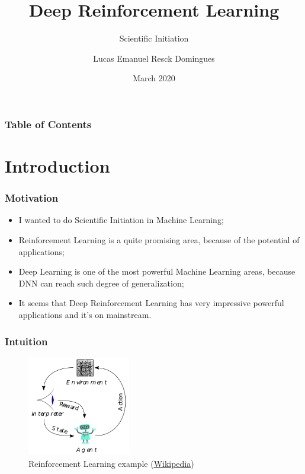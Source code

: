 \documentclass{beamer}
\title[Deep Reinforcement Learning]{Deep Reinforcement Learning}
\subtitle{Scientific Initiation}
\author[Domingues]{Lucas Emanuel Resck Domingues}
\institute[FGV]
{
  Escola de Matemática Aplicada \\
  Fundação Getulio Vargas
}
\date[2020]
{March 2020}
\begin{document}
    \frame{\titlepage}

    \begin{frame}
        \frametitle{Table of Contents}
        \tableofcontents
    \end{frame}

    \section{Introduction}

        \begin{frame}
            \frametitle{Motivation}

            \begin{itemize}
                \item I wanted to do Scientific Initiation in Machine Learning;
                \item Reinforcement Learning is a quite promising area, because of the potential of applications;
                \item Deep Learning is one of the most powerful Machine Learning areas, because DNN can reach such degree of generalization;
                \item It seems that Deep Reinforcement Learning has very impressive powerful applications and it's on mainstream.
            \end{itemize}

        \end{frame}

        \begin{frame}
            \frametitle{Intuition}

            \begin{figure}
                \centering
                \includegraphics[width=0.4\textwidth]{figures/rl.png}
                \caption{Reinforcement Learning example (\href{https://en.wikipedia.org/wiki/Reinforcement_learning}{Wikipedia})}
                \label{fig14:rl}
            \end{figure}

        \end{frame}
\end{document}
